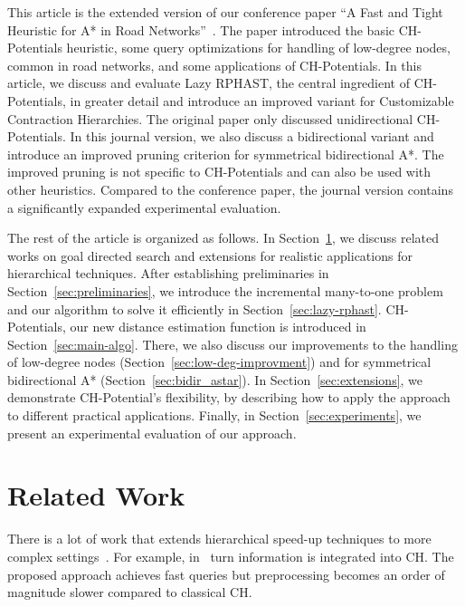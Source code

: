 \documentclass[manuscript,review]{acmart}
\begin{document}
This article is the extended version of our conference paper ``A Fast and Tight Heuristic for A* in Road Networks''~\cite{strasser_et_al:LIPIcs.SEA.2021.6}.
The paper introduced the basic CH-Potentials heuristic, some query optimizations for handling of low-degree nodes, common in road networks, and some applications of CH-Potentials.
In this article, we discuss and evaluate Lazy RPHAST, the central ingredient of CH-Potentials, in greater detail and introduce an improved variant for Customizable Contraction Hierarchies.
The original paper only discussed unidirectional CH-Potentials.
In this journal version, we also discuss a bidirectional variant and introduce an improved pruning criterion for symmetrical bidirectional A*.
The improved pruning is not specific to CH-Potentials and can also be used with other heuristics.
Compared to the conference paper, the journal version contains a significantly expanded experimental evaluation.

The rest of the article is organized as follows.
In Section~\ref{sec:related_work}, we discuss related works on goal directed search and extensions for realistic applications for hierarchical techniques.
After establishing preliminaries in Section~\ref{sec:preliminaries}, we introduce the incremental many-to-one problem and our algorithm to solve it efficiently in Section~\ref{sec:lazy-rphast}.
CH-Potentials, our new distance estimation function is introduced in Section~\ref{sec:main-algo}.
There, we also discuss our improvements to the handling of low-degree nodes (Section~\ref{sec:low-deg-improvment}) and for symmetrical bidirectional A* (Section~\ref{sec:bidir_astar}).
In Section~\ref{sec:extensions}, we demonstrate CH-Potential's flexibility, by describing how to apply the approach to different practical applications.
Finally, in Section~\ref{sec:experiments}, we present an experimental evaluation of our approach.

\section{Related Work}\label{sec:related_work}

There is a lot of work that extends hierarchical speed-up techniques to more complex settings~\cite{bdgmpsww-rptn-16}.
For example, in~\cite{gv-errnt-11} turn information is integrated into CH.
The proposed approach achieves fast queries but preprocessing becomes an order of magnitude slower compared to classical CH.
\end{document}
